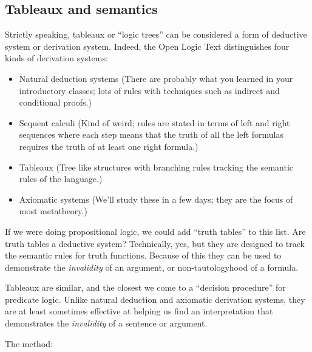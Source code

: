 \documentclass[12pt]{report}
\theoremstyle{nonumberplain}
\begin{document}
\subsection*{Tableaux and semantics}

Strictly speaking, tableaux or ``logic trees'' can be considered a form of deductive system or derivation system. Indeed, the Open Logic Text distinguishes four kinds of derivation systems:

\begin{itemize}[leftmargin=*]
\item Natural deduction systems (There are probably what you learned in your introductory classes; lots of rules with techniques such as indirect and conditional proofs.)
\item Sequent calculi (Kind of weird; rules are stated in terms of left and right sequences where each step means that the truth of all the left formulas requires the truth of at least one right formula.)
\item Tableaux (Tree like structures with branching rules tracking the semantic rules of the language.)
\item Axiomatic systems (We'll study these in a few days; they are the focus of most metatheory.)
\end{itemize}

\noindent If we were doing propositional logic, we could add ``truth tables'' to this list. Are truth tables a deductive system? Technically, yes, but they are designed to track the semantic rules for truth functions. Because of this they can be used to demonstrate the \emph{invalidity} of an argument, or non-tautologyhood of a formula.

Tableaux are similar, and the closest we come to a ``decision procedure'' for predicate logic. Unlike natural deduction and axiomatic derivation systems, they are at least sometimes effective at helping us find an interpretation that demonstrates the \emph{invalidity} of a sentence or argument.

The method:
\end{document}
